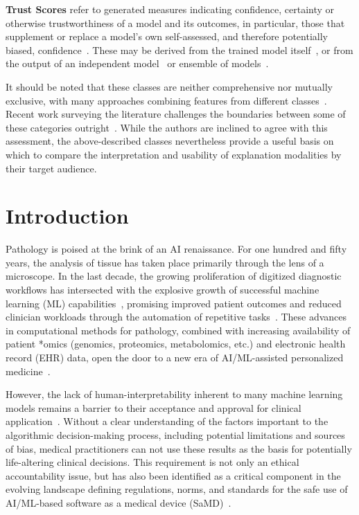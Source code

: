 \documentclass[final,5p,times,twocolumn,hyphens]{elsarticle}
\begin{document}
\textbf{Trust Scores} refer to generated measures indicating confidence, certainty or otherwise trustworthiness of a model and its outcomes, in particular, those that supplement or replace a model's own self-assessed, and therefore potentially biased, confidence~\cite{jiang2018trust, wang2021ai}. These may be derived from the trained model itself~\cite{tagasovska2019single}, or from the output of an independent model~\cite{jiang2018trust} or ensemble of models~\cite{pearce2018high}.

It should be noted that these classes are neither comprehensive nor mutually exclusive, with many approaches combining features from different classes~\cite{kim2016examples,liu2019generative}. Recent work surveying the literature challenges the boundaries between some of these categories outright~\cite{zhang2021survey}. While the authors are inclined to agree with this assessment, the above-described classes nevertheless provide a useful basis on which to compare the interpretation and usability of explanation modalities by their target audience.

\section{Introduction}
\label{sec:introduction}

Pathology is poised at the brink of an AI renaissance. For one hundred and fifty years, the analysis of tissue has taken place primarily through the lens of a microscope. In the last decade, the growing proliferation of digitized diagnostic workflows has intersected with the explosive growth of successful machine learning (ML) capabilities~\cite{Pantanowitz:2010:DigitalPathology,PantanowitzEtAl:2021:AIPatho}, promising improved patient outcomes and reduced clinician workloads through the automation of repetitive tasks~\cite{das2020computer}. These advances in computational methods for pathology, combined with increasing availability of patient *omics (genomics, proteomics, metabolomics, etc.) and electronic health record (EHR) data, open the door to a new era of AI/ML-assisted personalized medicine~\cite{acs2020artificial,holzinger_artificial_2020}.

However, the lack of human-interpretability inherent to many machine learning models remains a barrier to their acceptance and approval for clinical application~\cite{cui2021artificial}. Without a clear understanding of the factors important to the algorithmic decision-making process, including potential limitations and sources of bias, medical practitioners can not use these results as the basis for potentially life-altering clinical decisions. This requirement is not only an ethical accountability issue, but has also been identified as a critical component in the evolving landscape defining regulations, norms, and standards for the safe use of AI/ML-based software as a medical device (SaMD)~\cite{EU_White, ISO_IEC_TR_24028}.
\end{document}
